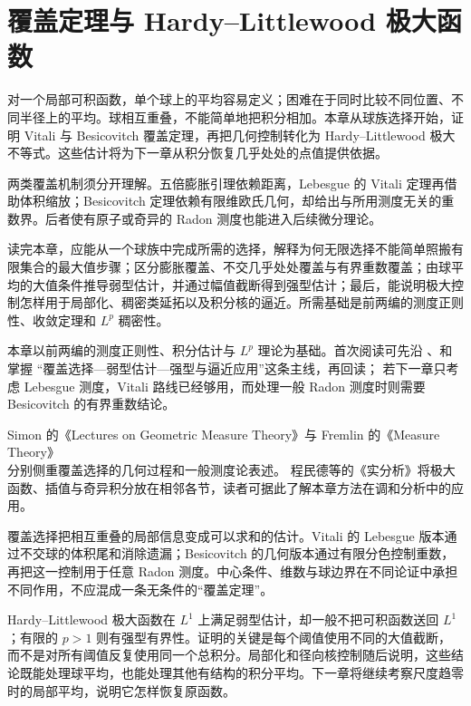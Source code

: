 \chapter{覆盖定理与 Hardy–Littlewood 极大函数}
\label{b1:ch:13}
\begin{chapterabstract}
对一个局部可积函数，单个球上的平均容易定义；困难在于同时比较不同位置、不同半径上的平均。球相互重叠，不能简单地把积分相加。本章从球族选择开始，证明 Vitali 与 Besicovitch 覆盖定理，再把几何控制转化为 Hardy--Littlewood 极大不等式。这些估计将为下一章从积分恢复几乎处处的点值提供依据。

两类覆盖机制须分开理解。五倍膨胀引理依赖距离，Lebesgue 的 Vitali 定理再借助体积缩放；Besicovitch 定理依赖有限维欧氏几何，却给出与所用测度无关的重数界。后者使有原子或奇异的 Radon 测度也能进入后续微分理论。
\end{chapterabstract}

\begin{learninggoals}
读完本章，应能从一个球族中完成所需的选择，解释为何无限选择不能简单照搬有限集合的最大值步骤；区分膨胀覆盖、不交几乎处处覆盖与有界重数覆盖；由球平均的大值条件推导弱型估计，并通过幅值截断得到强型估计；最后，能说明极大控制怎样用于局部化、稠密类延拓以及积分核的逼近。所需基础是前两编的测度正则性、收敛定理和 \(L^p\) 稠密性。
\end{learninggoals}

本章以前两编的测度正则性、积分估计与 \(L^p\) 理论为基础。首次阅读可先沿
、和掌握
“覆盖选择—弱型估计—强型与逼近应用”这条主线，再回读；
若下一章只考虑 Lebesgue 测度，Vitali 路线已经够用，而处理一般 Radon 测度时则需要
Besicovitch 的有界重数结论。

\ProseParagraphBreak

Simon 的《Lectures on Geometric Measure Theory》与 Fremlin 的《Measure Theory》\cite{Simon1983Lectures,Fremlin2016Measure}分别侧重覆盖选择的几何过程和一般测度论表述。
程民德等的《实分析》\cite{Cheng2008RealAnalysis}将极大函数、插值与奇异积分放在相邻各节，读者可据此了解本章方法在调和分析中的应用。





\begin{chaptersummary}
覆盖选择把相互重叠的局部信息变成可以求和的估计。Vitali 的 Lebesgue 版本通过不交球的体积尾和消除遗漏；Besicovitch 的几何版本通过有限分色控制重数，再把这一控制用于任意 Radon 测度。中心条件、维数与球边界在不同论证中承担不同作用，不应混成一条无条件的“覆盖定理”。

\ProseParagraphBreak

Hardy--Littlewood 极大函数在 \(L^1\) 上满足弱型估计，却一般不把可积函数送回 \(L^1\)；有限的 \(p>1\) 则有强型有界性。证明的关键是每个阈值使用不同的大值截断，而不是对所有阈值反复使用同一个总积分。局部化和径向核控制随后说明，这些结论既能处理球平均，也能处理其他有结构的积分平均。下一章将继续考察尺度趋零时的局部平均，说明它怎样恢复原函数。
\end{chaptersummary}


